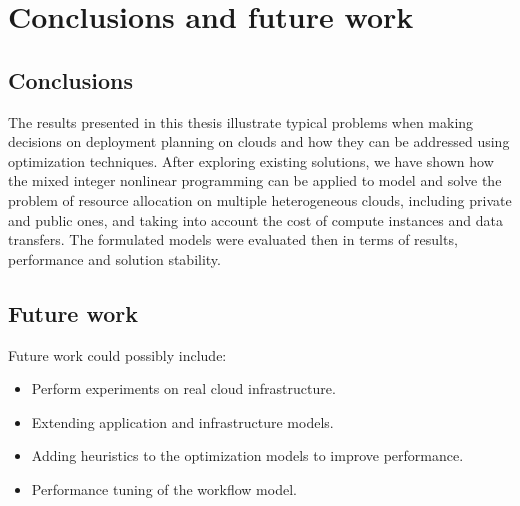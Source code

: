 \chapter{Conclusions and future work}
\label{chap:conclusions} 

\section{Conclusions}

The results presented in this thesis illustrate typical problems when making decisions on deployment planning on clouds and how they can be addressed using optimization techniques. After exploring existing solutions, we have shown how the mixed integer nonlinear programming can be applied to model and solve the problem of resource allocation on multiple heterogeneous clouds, including private and public ones, and taking into account the cost of compute instances and data transfers. The formulated models were evaluated then in terms of results, performance and solution stability.

\section{Future work}

Future work could possibly include:

\begin{itemize}
  \item Perform experiments on real cloud infrastructure.
  \item Extending application and infrastructure models.
  \item Adding heuristics to the optimization models to improve performance.
  \item Performance tuning of the workflow model.
\end{itemize}
